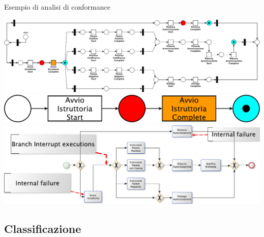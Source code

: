 \documentclass[10pt]{beamer}
\begin{document}
	
	\begin{frame}{}
	  Esempio di analisi di conformance
	  \begin{center}
	    \includegraphics[scale=0.50]{./fig/animazioneconf/ConfPNfinal}\\[10pt]
	    \includegraphics[scale=0.20]{./fig/animazioneconf/ConfPNz}\\[10pt]
	    \includegraphics[scale=0.50]{./fig/animazioneconf/BPMNConf}
	  \end{center}
	\end{frame}
	
	

	\subsection{Classificazione}
		
	
\end{document}
